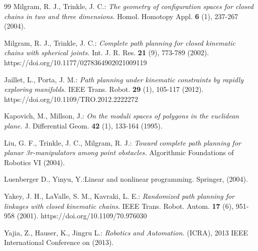 \documentclass[10pt,a4paper]{article}
\theoremstyle{definition}
\theoremstyle{remark}
\numberwithin{equation}{section}
\begin{document}
\begin{thebibliography}{99}
 Milgram, R. J., Trinkle, J. C.: \emph{The geometry of configuration spaces for closed chains in two and three dimensions.} Homol.  Homotopy Appl.  \textbf{6} (1), 237-267 (2004). 


 Milgram, R. J., Trinkle, J. C.: \emph{Complete path planning for closed kinematic chains with spherical joints.} Int. J. R. Res. \textbf{21} (9), 773-789 (2002). https://doi.org/10.1177/0278364902021009119

 Jaillet, L., Porta, J. M.: \emph{Path planning under kinematic constraints by rapidly exploring manifolds.} IEEE Trans. Robot.  \textbf{29} (1), 105-117 (2012). https://doi.org/10.1109/TRO.2012.2222272

 Kapovich,  M.,  Millson, J.: \emph{On the moduli spaces of polygons in the euclidean plane.} J.  Differential Geom.  \textbf{42} (1), 133-164 (1995). 

 Liu, G. F., Trinkle, J. C.,  Milgram, R. J.: \emph{Toward complete path planning for planar 3r-manipulators among point obstacles.} Algorithmic Foundations of Robotics VI  (2004). 


  Luenberger D.,  Yinyu, Y.:{Linear and nonlinear programming.}   Springer,  (2004). 

 Yakey, J. H., LaValle, S. M., Kavraki, L. E.: \emph{Randomized path planning for linkages with closed kinematic chains.} IEEE Trans.  Robot.  Autom. \textbf{17} (6), 951-958 (2001). https://doi.org/10.1109/70.976030

  Yajia, Z.,  Hauser,  K., Jingru L.: \emph{Robotics and Automation.} (ICRA), 2013 IEEE International Conference on (2013). 


\end{thebibliography}	


%

%





\end{document}
